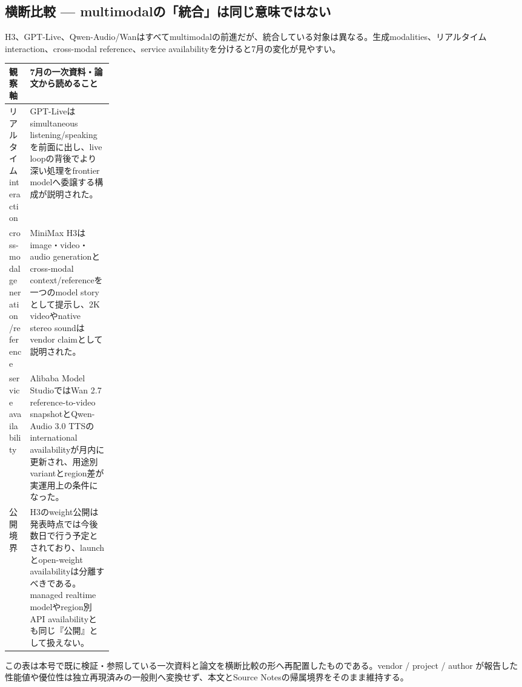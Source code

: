 \subsection*{横断比較 — multimodalの「統合」は同じ意味ではない}
H3、GPT-Live、Qwen-Audio/Wanはすべてmultimodalの前進だが、統合している対象は異なる。生成modalities、リアルタイムinteraction、cross-modal reference、service availabilityを分けると7月の変化が見やすい。
\medskip
\begin{center}
\small
\renewcommand{\arraystretch}{1.16}
\begin{tabularx}{\linewidth}{@{}p{0.20\linewidth}X@{}}
\toprule
観察軸 & 7月の一次資料・論文から読めること \\
\midrule
リアルタイムinteraction & GPT-Liveはsimultaneous listening/speakingを前面に出し、live loopの背後でより深い処理をfrontier modelへ委譲する構成が説明された。 \cite{src-3fb14968493d} \\
cross-modal generation/reference & MiniMax H3はimage・video・audio generationとcross-modal context/referenceを一つのmodel storyとして提示し、2K videoやnative stereo soundはvendor claimとして説明された。 \cite{src-d8e13386974c} \\
service availability & Alibaba Model StudioではWan 2.7 reference-to-video snapshotとQwen-Audio 3.0 TTSのinternational availabilityが月内に更新され、用途別variantとregion差が実運用上の条件になった。 \cite{src-eac8dfbeb78c} \\
公開境界 & H3のweight公開は発表時点では今後数日で行う予定とされており、launchとopen-weight availabilityは分離すべきである。managed realtime modelやregion別API availabilityとも同じ『公開』として扱えない。 \cite{src-d8e13386974c,src-3fb14968493d,src-eac8dfbeb78c} \\
\bottomrule
\end{tabularx}
\renewcommand{\arraystretch}{1.0}
\end{center}
\normalsize
\begin{claimboundary}[この比較の境界]
この表は本号で既に検証・参照している一次資料と論文を横断比較の形へ再配置したものである。vendor / project / author が報告した性能値や優位性は独立再現済みの一般則へ変換せず、本文とSource Notesの帰属境界をそのまま維持する。
\end{claimboundary}
